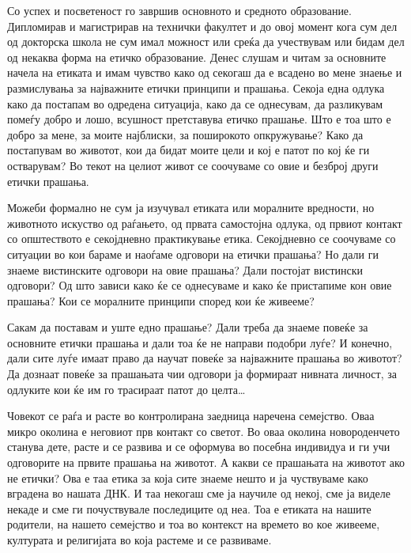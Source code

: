 \documentclass[12pt,a4paper]{article}
\begin{document}
\thispagestyle{empty}


Со успех и посветеност го завршив основното и средното образование. Дипломирав и
магистрирав на технички факултет и до овој момент кога сум дел од докторска
школа не сум имал можност или среќа да учествувам или бидам дел од некаква форма
на етичко образование. Денес слушам и читам за основните начела на етиката и
имам чувство како од секогаш да е всадено во мене знаење и размислувања за
најважните етички принципи и прашања. Секоја една одлука како да постапам во
одредена ситуација, како да се однесувам, да разликувам помеѓу добро и лошо,
всушност претставува етичко прашање. Што е тоа што е добро за мене, за моите
најблиски, за поширокото опкружување? Како да постапувам во животот, кои да
бидат моите цели и кој е патот по кој ќе ги остварувам? Во текот на целиот живот
се соочуваме со овие и безброј други етички прашања.

Можеби формално не сум ја изучувал етиката или моралните вредности, но животното
искуство од раѓањето, од првата самостојна одлука, од првиот контакт со
општеството е секојдневно практикување етика. Секојдневно се соочуваме со
ситуации во кои бараме и наоѓаме одговори на етички прашања? Но дали ги знаеме
вистинските одговори на овие прашања? Дали постојат вистински одговори? Од што
зависи како ќе се однесуваме и како ќе пристапиме кон овие прашања? Кои се
моралните принципи според кои ќе живееме?

Сакам да поставам и уште едно прашање? Дали треба да знаеме повеќе за основните
етички прашања и дали тоа ќе не направи подобри луѓе? И конечно, дали сите луѓе
имаат право да научат повеќе за најважните прашања во животот? Да дознаат повеќе
за прашањата чии одговори ја формираат нивната личност, за одлуките кои ќе им го
трасираат патот до целта\ldots

Човекот се раѓа и расте во контролирана заедница наречена семејство. Оваа микро
околина е неговиот прв контакт со светот. Во оваа околина новороденчето станува
дете, расте и се развива и се оформува во посебна индивидуа и ги учи одговорите
на првите прашања на животот. А какви се прашањата на животот ако не етички? Ова
е таа етика за која сите знаеме нешто и ја чуствуваме како вградена во нашата
ДНК. И таа некогаш сме ја научиле од некој, сме ја виделе некаде и сме ги
почуствувале последиците од неа. Тоа е етиката на нашите родители, на нашето
семејство и тоа во контекст на времето во кое живееме, културата и религијата во
која растеме и се развиваме.
\end{document}
